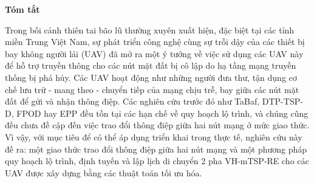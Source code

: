 \documentclass[a4paper]{article}
\title{}
\author{Vũ Văn Minh}
\date{\today}
\makeatletter
\renewcommand{\paragraph}{%
  \@startsection{paragraph}{4}{\z@}%
  {1.25ex \@plus 1ex \@minus .2ex}%
  {0.5em}%
  {\normalfont\normalsize\bfseries}%
}
\makeatother
\begin{document}
\renewcommand{\appendixname}{Chương}
\renewcommand{\contentsname}{Mục lục}
\renewcommand{\listtablename}{Danh sách bảng biểu \addcontentsline{toc}{section}{Danh sách bảng biểu}}
\renewcommand{\listfigurename}{Danh sách hình ảnh \addcontentsline{toc}{section}{Danh sách hình ảnh}}
\renewcommand{\listalgorithmname}{Danh sách thuật toán \addcontentsline{toc}{section}{Danh sách thuật toán}}
\renewcommand{\tablename}{Bảng}
\renewcommand{\figurename}{Hình}

\algrenewcommand{}
\algrenewcommand{}

\renewcommand{\cftsecaftersnum}{.}
\renewcommand{\cftsubsecaftersnum}{.}
\renewcommand{\cftsecleader}{\cftdotfill{\cftdotsep}}
\newenvironment{zeroindent}
  {\par\setlength{\parindent}{0pt}}
  {\par}

\newenvironment{thankpage}{}{}
\newcommand{\quotes}[1]{``#1''}






{}
\fontsize{13pt}{16.9pt}\selectfont  %

{\huge \bfseries {Tóm tắt}}

Trong bối cảnh thiên tai bão lũ thường xuyên xuất hiện, đặc biệt tại các tỉnh miền Trung Việt Nam, sự phát triển công nghệ cùng sự trỗi dậy của các thiết bị bay không người lái (UAV) đã mở ra một ý tưởng về việc sử dụng các UAV này để hỗ trợ truyền thông cho các nút mặt đất bị cô lập do hạ tầng mạng truyền thống bị phá hủy. 
Các UAV hoạt động như những người đưa thư, tận dụng cơ chế lưu trữ - mang theo - chuyển tiếp của mạng chịu trễ, bay giữa các nút mặt đất để gửi và nhận thông điệp. 
Các nghiên cứu trước đó như TaBaf, DTP-TSP-D, FPOD hay EPP đều tồn tại các hạn chế về quy hoạch lộ trình, và chúng cũng đều chưa đề cập đến việc trao đổi thông điệp giữa hai nút mạng ở mức giao thức. 
Vì vậy, với mục tiêu để có thể áp dụng triển khai trong thực tế, nghiên cứu này đề ra: một giao thức trao đổi thông điệp giữa hai nút mạng và một phương pháp quy hoạch lộ trình, định tuyến và lập lịch di chuyển 2 pha VH-mTSP-RE cho các UAV được xây dựng bằng các thuật toán tối ưu hóa.
\end{document}
